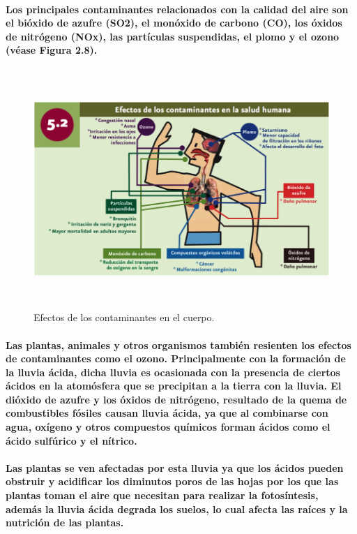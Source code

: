     \paragraph {Los principales contaminantes relacionados con la calidad del aire son el bióxido de azufre (SO2), el monóxido de carbono (CO), los óxidos  de nitrógeno (NOx), las partículas suspendidas, el plomo y el ozono (véase Figura 2.8).}
  
    \begin{figure}[h!]
      \centering
       \includegraphics[width=12.5cm,height=9cm]{./images/1.png}
       \caption{Efectos de los contaminantes en el cuerpo.}
    \end{figure}

    \paragraph {Las plantas, animales y otros organismos también resienten los efectos de contaminantes como el ozono. Principalmente con la formación de la lluvia ácida, dicha lluvia es ocasionada con la presencia de ciertos ácidos en la atomósfera que se precipitan a la tierra con la lluvia. El dióxido de azufre y los óxidos de nitrógeno, resultado de la quema de combustibles  fósiles causan lluvia ácida, ya que al combinarse con agua, oxígeno y otros compuestos químicos forman ácidos como el ácido sulfúrico y el nítrico. }
    \paragraph{Las plantas se ven afectadas por esta lluvia ya que los ácidos pueden obstruir y acidificar los diminutos poros de las hojas por los que las plantas toman el aire que necesitan para realizar la fotosíntesis, además la lluvia ácida degrada los suelos, lo cual afecta las raíces y la nutrición de las plantas.}
  
